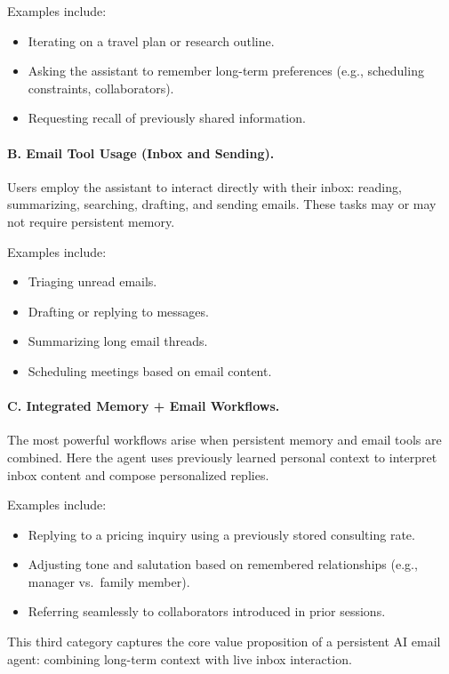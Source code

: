 Examples include:
\begin{itemize}
    \item Iterating on a travel plan or research outline.
    \item Asking the assistant to remember long-term preferences (e.g., scheduling constraints, collaborators).
    \item Requesting recall of previously shared information.
\end{itemize}

\paragraph{B. Email Tool Usage (Inbox and Sending).}
Users employ the assistant to interact directly with their inbox: reading, summarizing, searching, drafting, and sending emails. These tasks may or may not require persistent memory.

Examples include:
\begin{itemize}
    \item Triaging unread emails.
    \item Drafting or replying to messages.
    \item Summarizing long email threads.
    \item Scheduling meetings based on email content.
\end{itemize}

\paragraph{C. Integrated Memory + Email Workflows.}
The most powerful workflows arise when persistent memory and email tools are combined. Here the agent uses previously learned personal context to interpret inbox content and compose personalized replies.

Examples include:
\begin{itemize}
    \item Replying to a pricing inquiry using a previously stored consulting rate.
    \item Adjusting tone and salutation based on remembered relationships (e.g., manager vs.\ family member).
    \item Referring seamlessly to collaborators introduced in prior sessions.
\end{itemize}

This third category captures the core value proposition of a persistent AI email agent: combining long-term context with live inbox interaction.


